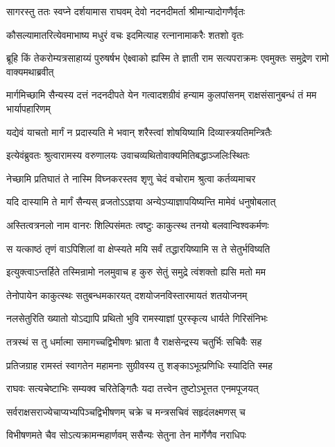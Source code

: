 \twolineshloka
{सागरस्तु ततः स्वप्ने दर्शयामास राघवम्}
{देवो नदनदीमर्ता श्रीमान्यादोगणैर्वृतः}


\twolineshloka
{कौसल्यामातरित्येवमाभाष्य मधुरं वचः}
{इदमित्याह रत्नानामाकरैः शतशो वृतः}


\threelineshloka
{ब्रूहि किं तेकरोम्यत्रसाहाय्यं पुरुषर्षभ}
{ऐक्ष्वाको ह्यस्मि ते ज्ञाती राम सत्यपराक्रमः}
{एवमुक्तः समुद्रेण रामो वाक्यमथाब्रवीत्}


\threelineshloka
{मार्गमिच्छामि सैन्यस्य दत्तं नदनदीपते}
{येन गत्वादशग्रीवं हन्याम कुलपांसनम्}
{राक्षसंसानुबन्धं तं मम भार्यापहारिणम्}


\twolineshloka
{यद्येवं याचतो मार्गं न प्रदास्यति मे भवान्}
{शरैस्त्वां शोषयिष्यामि दिव्यास्त्रयतिमन्त्रितैः}


\twolineshloka
{इत्येवंब्रुवतः श्रुत्वारामस्य वरुणालयः}
{उवाचव्यथितोवाक्यमितिबद्धाञ्जलिःस्थितः}


\twolineshloka
{नेच्छामि प्रतिघातं ते नास्मि विघ्नकरस्तव}
{शृणु चेदं वचोराम श्रुत्वा कर्तव्यमाचर}


\twolineshloka
{यदि दास्यामि ते मार्गं सैन्यस् व्रजतोऽऽज्ञया}
{अन्येऽप्याज्ञापयिष्यन्ति मामेवं धनुषोबलात्}


\twolineshloka
{अस्तित्वत्रनलो नाम वानरः शिल्पिसंमतः}
{त्वष्टुः काकुत्स्थ तनयो बलवान्विश्वकर्मणः}


\twolineshloka
{स यत्काष्ठं तृणं वाऽपिशिलां वा क्षेप्स्यते मयि}
{सर्वं तद्धारयिष्यामि स ते सेतुर्भविष्यति}


\twolineshloka
{इत्युक्त्वाऽन्तर्हिते तस्मिन्रामो नलमुवाच ह}
{कुरु सेतुं समुद्रे त्वंशक्तो ह्यसि मतो मम}


\twolineshloka
{तेनोपायेन काकुत्स्थः सतुबन्धमकारयत्}
{दशयोजनविस्तारमायतं शतयोजनम्}


\twolineshloka
{नलसेतुरिति ख्यातो योऽद्यापि प्रथितो भुवि}
{रामस्याज्ञां पुरस्कृत्य धार्यते गिरिसंनिभः}


\twolineshloka
{तत्रस्थं स तु धर्मात्मा समागच्चद्विभीषणः}
{भ्राता वै राक्षसेन्द्रस्य चतुर्भिः सचिवैः सह}


\twolineshloka
{प्रतिजग्राह रामस्तं स्वागतेन महामनाः}
{सुग्रीवस्य तु शङ्काऽभूत्प्रणिधिः स्यादिति स्मह}


\twolineshloka
{राघवः सत्यचेष्टाभिः सम्यक्व चरितेङ्गितैः}
{यदा तत्त्वेन तुष्टोऽभूत्तत एनमपूजयत्}


\twolineshloka
{सर्वराक्षसराज्येचाप्यभ्यपिञ्चद्विभीषणम्}
{चक्रे च मन्त्रसचिवं सहृदंलक्ष्मणस् च}


\twolineshloka
{विभीषणमते चैव सोऽत्यक्रामन्महार्णवम्}
{ससैन्यः सेतुना तेन मार्गेणैव नराधिपः}


